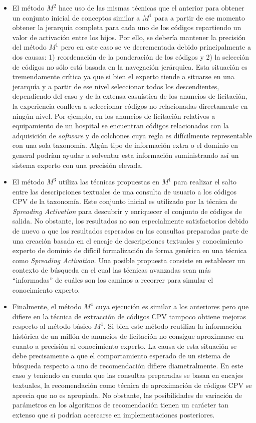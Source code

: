\begin{itemize}
\item El método $M^2$ hace uso de las mismas técnicas que el anterior para obtener un conjunto inicial de conceptos 
similar a $M^1$ para a partir de ese momento obtener la jerarquía completa para cada uno de los códigos repartiendo 
un valor de activación entre los hijos. Por ello, se debería mantener la precisión del método $M^1$ pero en este caso 
se ve decrementada debido principalmente a dos causas: 1) reordenación de la ponderación de los códigos y 2) la selección 
de códigos no sólo está basada en la navegación jerárquica. Esta situación es tremendamente crítica ya que si bien el experto 
tiende a situarse en una jerarquía y a partir de ese nivel seleccionar todos los descendientes, dependiendo del caso y de la 
extensa casuística de los anuncios de licitación, la experiencia conlleva a seleccionar códigos no relacionadas directamente 
en ningún nivel. Por ejemplo, en los anuncios de licitación relativos a equipamiento de un hospital se encuentran códigos 
relacionados con la adquisición de \textit{software} y de colchones cuya regla es difícilmente representable con 
una sola taxonomía. Algún tipo de información extra o el dominio en general podrían ayudar a solventar esta información suministrando
así un sistema experto con una precisión elevada.

\item El método $M^3$ utiliza las técnicas propuestas en $M^1$ para realizar el salto entre las descripciones textuales 
de una consulta de usuario a los códigos CPV de la taxonomía. Este conjunto inicial es utilizado por la técnica de \textit{Spreading 
Activation} para descubrir y enriquecer el conjunto de códigos de salida. No obstante, los resultados no son especialmente satisfactorios 
debido de nuevo a que los resultados esperados en las consultas preparadas parte de una creación basada en el encaje de descripciones 
textuales y conocimiento experto de dominio de difícil formalización de forma genérica en una técnica como \textit{Spreading Activation}. Una 
posible propuesta consiste en establecer un contexto de búsqueda en el cual las técnicas avanzadas sean más ``informadas'' de cuáles 
son los caminos a recorrer para simular el conocimiento experto.

\item Finalmente, el método $M^4$ cuya ejecución es similar a los anteriores pero que difiere en la técnica de extracción 
de códigos CPV tampoco obtiene mejoras respecto al método básico $M^1$. Si bien este método reutiliza la información histórica 
de un millón de anuncios de licitación no consigue aproximarse en cuanto a precisión al conocimiento experto. La causa de esta 
situación se debe precisamente a que el comportamiento esperado de un sistema de búsqueda respecto a uno de recomendación 
difiere diametralmente. En este caso y teniendo en cuenta que las consultas preparadas se basan en encajes textuales, 
la recomendación como técnica de aproximación de códigos CPV se aprecia que no es apropiada. No obstante, las posibilidades 
de variación de parámetros en los algoritmos de recomendación tienen un carácter tan extenso que si podrían acercarse 
en implementaciones posteriores.


\end{itemize}
